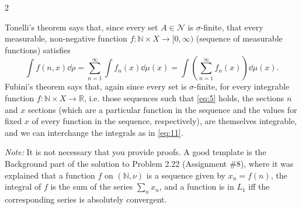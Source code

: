 \documentclass[11pt]{article}
\begin{document}
\begin{problem}{2}
\begin{enumerate}[label=\alph*.]
\begin{answer}
        Tonelli's theorem says that, since every set \( A \in \mathcal{N} \) is \(\sigma\)-finite, that every measurable, non-negative function \( f: \mathbb{N} \times X \rightarrow [0, \infty) \) (sequence of measurable functions) satisfies
        \begin{equation}
        \label{eq:11}
        \int f(n,x) \dd\rho = \sum\limits_{n=1}^{\infty} \int f_n(x) \dd\mu(x) = \int \left( \sum\limits_{n=1}^{\infty} f_n(x) \right) \dd\mu(x).
      \end{equation}
      Fubini's theorem says that, again since every set is \( \sigma \)-finite, for every integrable function \( f: \mathbb{N} \times X \rightarrow \mathbb{R} \), i.e. those sequences such that \cref{eq:5} holds, the sections \( n \) and \( x \) sections (which are a particular function in the sequence and the values for fixed \( x \) of every function in the sequence, respectively), are themselves integrable, and we can interchange the integrals as in \cref{eq:11}.
          \end{answer}
  \end{enumerate}
  \textit{Note:} It is not necessary that you provide proofs.
  A good template is the Background part of the solution to Problem 2.22 (Assignment \#8), where it was explained that a function \( f \) on \( (\mathbb{N}, \nu) \) is a sequence given by \( x_n = f(n) \), the integral of \( f \) is the sum of the series \( \sum\limits_n x_n \), and a function is in \( L_1 \) iff the corresponding series is absolutely convergent.
\end{problem}
\end{document}
